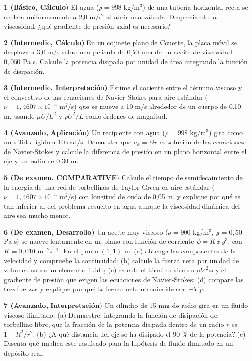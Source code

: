 \documentclass[10pt,openany]{book}
\begin{document}
\begin{tcolorbox}[title={Ejercicios propuestos}, studiumworked, breakable]

\noindent\textbf{1 (Básico, Cálculo)}
El agua (\(\rho = 998\) kg/m\(^3\)) de una tubería horizontal recta se acelera uniformemente a 2,0 m/s\(^2\) al abrir una válvula. Despreciando la viscosidad, ¿qué gradiente de presión axial es necesario?

\noindent\textbf{2 (Intermedio, Cálculo)}
En un cojinete plano de Couette, la placa móvil se desplaza a 3,0 m/s sobre una película de 0,50 mm de un aceite de viscosidad \(0{,}050\) Pa s. Calcule la potencia disipada por unidad de área integrando la función de disipación.

\noindent\textbf{3 (Intermedio, Interpretación)}
Estime el cociente entre el término viscoso y el convectivo de las ecuaciones de Navier-Stokes para aire estándar (\(\nu = 1{,}4607\times 10^{-5}\) m\(^2\)/s) que se mueve a 10 m/s alrededor de un cuerpo de 0,10 m, usando \(\mu U/L^{2}\) y \(\rho U^{2}/L\) como órdenes de magnitud.

\noindent\textbf{4 (Avanzado, Aplicación)}
Un recipiente con agua (\(\rho = 998\) kg/m\(^3\)) gira como un sólido rígido a 10 rad/s. Demuestre que \(u_\theta = \Omega r\) es solución de las ecuaciones de Navier-Stokes y calcule la diferencia de presión en un plano horizontal entre el eje y un radio de 0,30 m.

\noindent\textbf{5 (De examen, COMPARATIVE)}
Calcule el tiempo de semidecaimiento de la energía de una red de torbellinos de Taylor-Green en aire estándar (\(\nu = 1{,}4607\times 10^{-5}\) m\(^2\)/s) con longitud de onda de 0,05 m, y explique por qué es tan inferior al del problema resuelto en agua aunque la viscosidad dinámica del aire sea mucho menor.

\noindent\textbf{6 (De examen, Desarrollo)}
Un aceite muy viscoso (\(\rho = 900\) kg/m\(^3\), \(\mu = 0{,}50\) Pa s) se mueve lentamente en un plano con función de corriente \(\psi = K\,x\,y^{3}\), con \(K = 0{,}010\) m\(^{-2}\)s\(^{-1}\). En el punto \((1, 1)\) m: (a) obtenga las componentes de la velocidad y compruebe la continuidad; (b) calcule la fuerza neta por unidad de volumen sobre un elemento fluido; (c) calcule el término viscoso \(\mu\nabla^{2}\mathbf{u}\) y el gradiente de presión que exigen las ecuaciones de Navier-Stokes; (d) compare las tres fuerzas y explique por qué la fuerza neta no coincide con \(-\nabla p\).

\noindent\textbf{7 (Avanzado, Interpretación)}
Un cilindro de 15 mm de radio gira en un fluido viscoso ilimitado. (a) Demuestre, integrando la función de disipación del torbellino libre, que la fracción de la potencia disipada dentro de un radio \(r\) es \(1 - R^{2}/r^{2}\). (b) ¿A qué distancia del eje se ha disipado el 90 \% de la potencia? (c) Discuta qué implica este resultado para la hipótesis de fluido ilimitado en un depósito real.


\end{tcolorbox}
\end{document}
